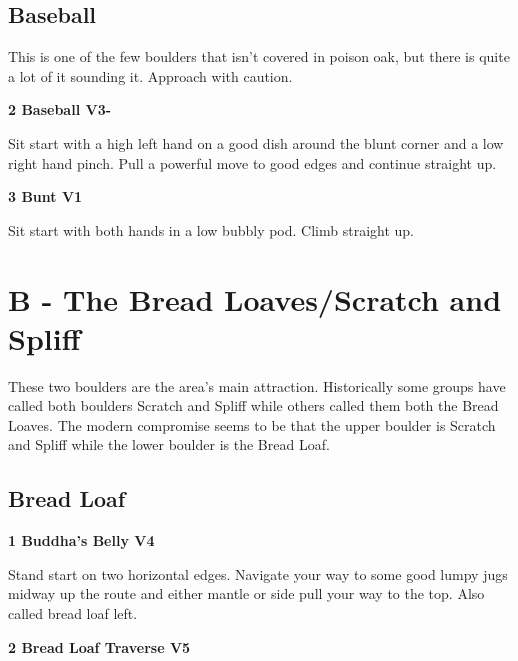 \begin{multicols}{2}
			\subsection*{Baseball}\label{bf:Baseball}
			This is one of the few boulders that isn't covered in poison oak, but there is quite a lot of it sounding it. Approach with caution.\\
			

					\label{rt:Baseball}
\colorbox{green!20}{
\parbox{0.95\linewidth}{
\textbf{
2 Baseball V3-   
}
}
}

					\begin{adjustwidth}{0.5cm}{}				
					Sit start with a high left hand on a good dish around the blunt corner and a low right hand pinch. Pull a powerful move to good edges and continue straight up.
					\end{adjustwidth}
					\label{rt:Bunt}
\colorbox{green!20}{
\parbox{0.95\linewidth}{
\textbf{
3 Bunt V1   
}
}
}

					\begin{adjustwidth}{0.5cm}{}				
					Sit start with both hands in a low bubbly pod. Climb straight up.
					\end{adjustwidth}
\newpage

		\section{B - The Bread Loaves/Scratch and Spliff}\label{sa:The Bread Loaves/Scratch and Spliff}
	These two boulders are the area's main attraction. Historically some groups have called both boulders Scratch and Spliff while others called them both the Bread Loaves. The modern compromise seems to be that the upper boulder is Scratch and Spliff while the lower boulder is the Bread Loaf.\\

	
			\subsection*{Bread Loaf}\label{bf:Bread Loaf}
						

					\label{rt:Buddha's Belly}
\colorbox{RoyalBlue!20}{
\parbox{0.95\linewidth}{
\textbf{
1 Buddha's Belly V4    
}
}
}

					\begin{adjustwidth}{0.5cm}{}				
					Stand start on two horizontal edges. Navigate your way to some good lumpy jugs midway up the route and either mantle or side pull your way to the top. Also called bread loaf left.
					\end{adjustwidth}
					\label{rt:Bread Loaf Traverse}
\colorbox{RoyalBlue!20}{
\parbox{0.95\linewidth}{
\textbf{
2 Bread Loaf Traverse V5    
}
}
}


\end{multicols}
